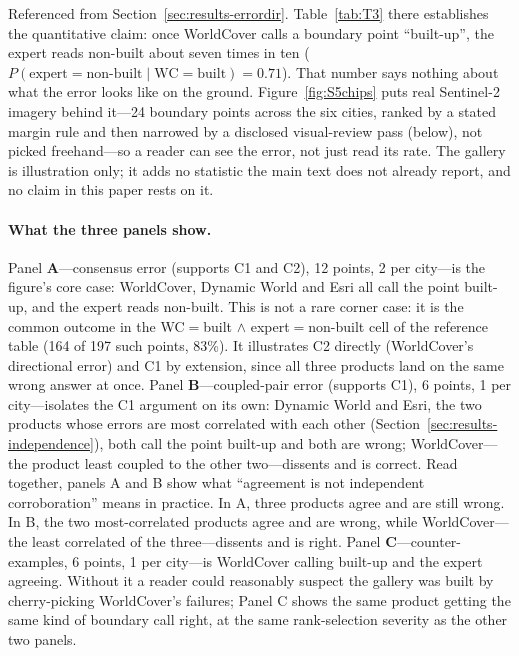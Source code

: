 \documentclass[remotesensing,article,submit,moreauthors]{Definitions/mdpi}
\begin{document}
Referenced from Section~\ref{sec:results-errordir}. Table~\ref{tab:T3}
there establishes the quantitative claim: once WorldCover calls a boundary
point ``built-up'', the expert reads non-built about seven times in ten
($P(\text{expert}=\text{non-built} \mid \text{WC}=\text{built}) = 0.71$).
That number says nothing about what the error looks like on the ground.
Figure~\ref{fig:S5chips} puts real Sentinel-2 imagery behind it---24 boundary
points across the six cities, ranked by a stated margin rule and then
narrowed by a disclosed visual-review pass (below), not picked
freehand---so a reader can see the error, not just read its rate. The
gallery is illustration only; it adds no statistic the main text does not
already report, and no claim in this paper rests on it.

\paragraph{What the three panels show.} Panel \textbf{A}---consensus error
(supports C1 and C2), 12 points, 2 per city---is the figure's core case:
WorldCover, Dynamic World and Esri all call the point built-up, and the
expert reads non-built. This is not a rare corner case: it is the common
outcome in the WC$=$built $\wedge$ expert$=$non-built cell of the reference
table (164 of 197 such points, 83\%). It illustrates C2 directly
(WorldCover's directional error) and C1 by extension, since all three
products land on the same wrong answer at once. Panel \textbf{B}---coupled-pair
error (supports C1), 6 points, 1 per city---isolates the C1 argument on its
own: Dynamic World and Esri, the two products whose errors are most
correlated with each other (Section~\ref{sec:results-independence}), both
call the point built-up and both are wrong; WorldCover---the product least
coupled to the other two---dissents and is correct. Read together, panels A
and B show what ``agreement is not independent corroboration'' means in
practice. In A, three products agree and are still wrong. In B, the two
most-correlated products agree and are wrong, while WorldCover---the least
correlated of the three---dissents and is right. Panel \textbf{C}---counter-examples,
6 points, 1 per city---is WorldCover calling built-up and the expert
agreeing. Without it a reader could reasonably suspect the gallery was built
by cherry-picking WorldCover's failures; Panel C shows the same product
getting the same kind of boundary call right, at the same rank-selection
severity as the other two panels.
\end{document}
